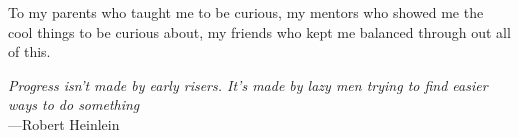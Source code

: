 %
\begin{frontmatter}

%
%
\makefrontmatter

%
%
%
%
%
%
\begin{dedication}
  To my parents who taught me to be curious, my mentors who showed me the cool things to be curious about, my friends who kept me balanced through out all of this.  
\end{dedication}


%
%



%
%
\begin{epigraph} %
  \emph{Progress isn't made by early risers.
                 It's made by lazy men trying to find easier ways to do something}\\
  ---Robert Heinlein
\end{epigraph}

%



\end{frontmatter}
